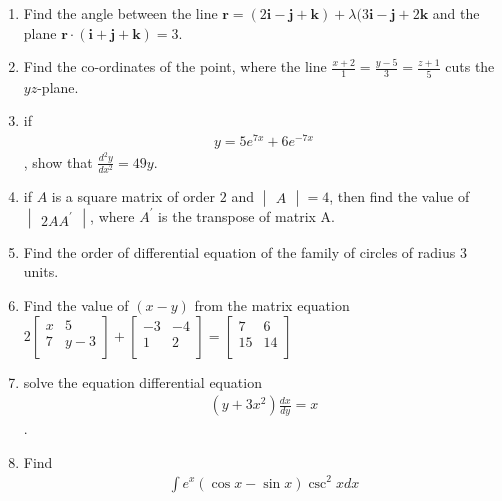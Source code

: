 \documentclass[12pt,-letter paper]{article}
\let\vec\mathbf{}
\let\vec\mathbf{}
\let\vec\mathbf{}
\begin{document}
	\begin{enumerate}	
\item  Find the angle between the line $\vec{r} = (2\vec{i}-\vec{j}+\vec{k})+ \lambda(3\vec{i}-\vec{j}+2\vec{k}$ and the plane $\vec{r}\cdot(\vec{i} +\vec{j}+\vec{k}) =3$.

\item Find the co-ordinates of the point, where the line $\frac{x+2}{1}=\frac{y-5}{3}=\frac{z+1}{5}$ cuts the $yz$-plane.

\item if \begin{align*}y= 5e^{7x}+6e^{-7x}\end{align*}  , show that $\frac{d^2y}{dx^2}=49y$.

\item if $A$ is a square matrix of order $2$ and $\begin{vmatrix}
		A
		\end{vmatrix} = 4$, then find the value of $\begin{vmatrix} 2AA^\prime\end{vmatrix}$, where $A^\prime$ is the transpose of matrix A.

\item Find the order of differential equation of the family of circles of radius $3$ units.

\item Find the value of $(x-y)$ from the matrix equation
	$
	2\begin{bmatrix}
	x & 5 \\
	7 & y-3 \\
	\end{bmatrix}+
	\begin{bmatrix}
	    -3 & -4 \\
	    1  & 2 \\
	\end{bmatrix}=
	\begin{bmatrix}
		7 & 6 \\
		15 & 14 \\
	\end{bmatrix}
        $
\item solve the equation differential equation \begin{align*}(y+3x^2)\frac{dx}{dy}=x\end{align*}.

\item Find \begin{align*}\int e^x(\cos x-\sin x)\csc^2 x dx\end{align*}


\end{enumerate}
\end{document}
